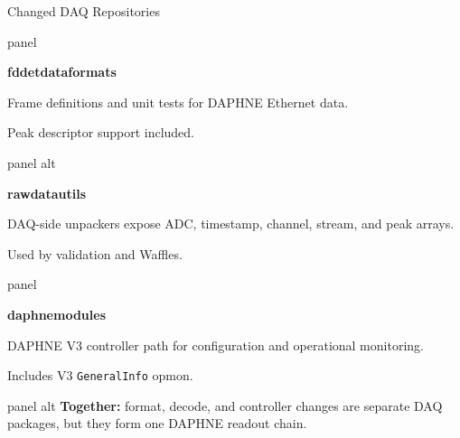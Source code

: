 \documentclass[aspectratio=169,10pt]{beamer}
\begin{document}
\begin{frame}[t]{Changed DAQ Repositories}
\vspace{1mm}
\noindent
\begin{minipage}[t]{0.31\textwidth}
\begin{beamercolorbox}[wd=\linewidth,sep=7pt,rounded=true]{panel}
\small
{\color{noircyan}\bfseries fddetdataformats\par}
\vspace{1mm}
Frame definitions and unit tests for DAPHNE Ethernet data.\par
\vspace{1mm}
\textcolor{duneorange}{Peak descriptor support included.}
\end{beamercolorbox}
\end{minipage}\hfill
\begin{minipage}[t]{0.31\textwidth}
\begin{beamercolorbox}[wd=\linewidth,sep=7pt,rounded=true]{panel alt}
\small
{\color{noircyan}\bfseries rawdatautils\par}
\vspace{1mm}
DAQ-side unpackers expose ADC, timestamp, channel, stream, and peak arrays.\par
\vspace{1mm}
\textcolor{noirmuted}{Used by validation and Waffles.}
\end{beamercolorbox}
\end{minipage}\hfill
\begin{minipage}[t]{0.31\textwidth}
\begin{beamercolorbox}[wd=\linewidth,sep=7pt,rounded=true]{panel}
\small
{\color{noircyan}\bfseries daphnemodules\par}
\vspace{1mm}
DAPHNE V3 controller path for configuration and operational monitoring.\par
\vspace{1mm}
\textcolor{noirmuted}{Includes V3 \texttt{GeneralInfo} opmon.}
\end{beamercolorbox}
\end{minipage}

\vspace{3mm}
\begin{beamercolorbox}[wd=\linewidth,sep=6pt,rounded=true]{panel alt}
\footnotesize
\textcolor{noircyan}{\textbf{Together:}} format, decode, and controller changes are separate DAQ packages, but they form one DAPHNE readout chain.
\end{beamercolorbox}
\end{frame}
\end{document}
